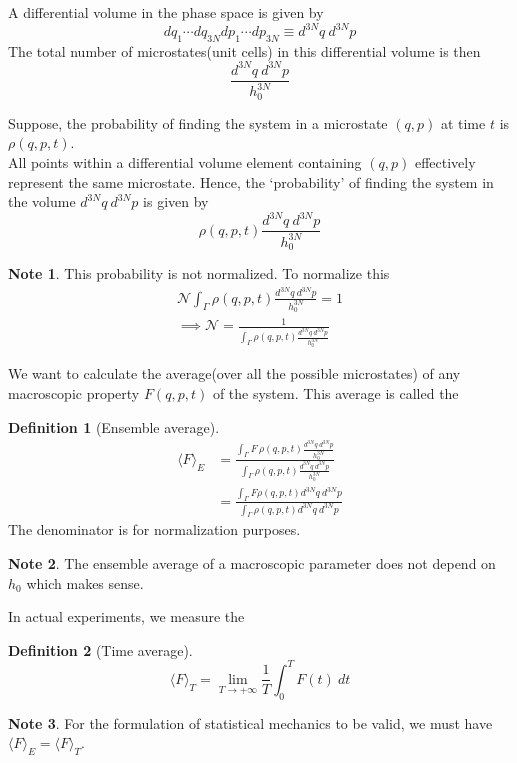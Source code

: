 \documentclass[10pt, a4paper]{extarticle}
\theoremstyle{definition}
\newtheorem{defn}{Definition}
\newtheorem*{note*}{Note}
\begin{document}
A differential volume in the phase space is given by
\[dq_1\cdots dq_{3N}dp_1\cdots dp_{3N}\equiv d^{3N}q\ d^{3N}p\]
The total number of microstates(unit cells) in this differential volume is then
\[\frac{d^{3N}q\ d^{3N}p}{h_0^{3N}}\]
\begin{framed}
Suppose, the probability of finding the system in a microstate $(q,p)$ at time $t$ is $\rho(q,p,t)$.\\
All points within a differential volume element containing $(q,p)$ effectively represent the same microstate. Hence, the `probability' of finding the system in the volume $d^{3N}q\ d^{3N}p$ is given by \[\rho(q,p,t)\frac{d^{3N}q\ d^{3N}p}{h_0^{3N}}\]
\begin{note*}
	This probability is not normalized. To normalize this
	\begin{align*}
		\mathcal{N}\int_{\Gamma}\rho(q,p,t)\frac{d^{3N}q\ d^{3N}p}{h_0^{3N}}=1\\
		\implies \mathcal{N}=\frac{1}{\int_{\Gamma}\rho(q,p,t)\frac{d^{3N}q\ d^{3N}p}{h_0^{3N}}}
	\end{align*}
\end{note*}
\end{framed}
We want to calculate the average(over all the possible microstates) of any macroscopic property $F(q,p,t)$ of the system. This average is called the
\begin{framed}
	\begin{defn}[Ensemble average]
		\begin{align*}
			\langle F\rangle_E&=\frac{\int_{\Gamma}F\ \rho(q,p,t)\frac{d^{3N}q\ d^{3N}p}{h_0^{3N}}}{\int_{\Gamma}\rho(q,p,t)\frac{d^{3N}q\ d^{3N}p}{h_0^{3N}}}\\
							  &=\frac{\int_{\Gamma}F\rho(q,p,t)d^{3N}q\ d^{3N}p}{\int_{\Gamma}\rho(q,p,t)d^{3N}q\ d^{3N}p}
		\end{align*}
		The denominator is for normalization purposes.
	\end{defn}
	\begin{note*}
		The ensemble average of a macroscopic parameter does not depend on $h_0$ which makes sense.
	\end{note*}
\end{framed}

In actual experiments, we measure the
\begin{framed}
	\begin{defn}[Time average]
		\[\langle F\rangle_T=\lim_{T\to +\infty}\frac{1}{T}\int_0^T F(t)\ dt\]
	\end{defn}
\end{framed}
\begin{note*}
	For the formulation of statistical mechanics to be valid, we must have $\langle F\rangle_E=\langle F\rangle_T$.
\end{note*}
\end{document}
